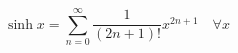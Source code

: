 \documentclass[utf-8]{minimal}
\begin{document}
	$$\sinh x=\sum _{n=0}^{\infty }{\frac {1}{(2n+1)!}}x^{2n+1}\quad \forall x$$
\end{document}
